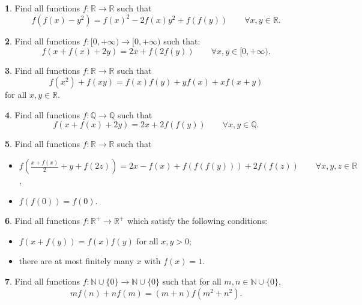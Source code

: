 \documentclass{article}
\theoremstyle{definition}
\newtheorem{p}{}
\begin{document}
\begin{p}
Find all functions $ f: \mathbb{R}\to\mathbb{R}$ such that 
\[f(f(x)-y^{2})=f(x)^{2}-2f(x)y^{2}+f(f(y)) \qquad \forall x,y \in \mathbb R.\]
\end{p}





\begin{p}
Find all functions $f: [0, +\infty) \to [0, +\infty)$ such that:
\[f(x+f(x)+2y)=2x+f(2f(y)) \qquad \forall x,y \in [0, +\infty).\]
\end{p}



\begin{p}
Find all functions $f:\mathbb{R}\to\mathbb{R}$ such that
\[f(x^2)+f(xy)=f(x)f(y)+yf(x)+xf(x+y)\]
for all $x,y\in\mathbb{R}$.
\end{p}


\begin{p}
Find all functions $ f: \mathbb{Q}\to\mathbb{Q}$ such that 
\[f(x+f(x)+2y)=2x+2f(f(y)) \qquad \forall x,y \in \mathbb Q.\]
\end{p}





\begin{p}
Find all functions $ f: \mathbb{R}\to\mathbb{R}$ such that 
\begin{itemize}
\item $f(\frac{x+f(x)}{2}+y+f(2z))=2x-f(x)+f(f(f(y)))+2f(f(z)) \qquad \forall x,y,z \in \mathbb R$,

\item $f(f(0))=f(0)$.

\end{itemize}
\end{p}



\begin{p}
Find all functions $f:\mathbb{R}^+ \to \mathbb{R}^+$ which satisfy the following conditions:
\begin{itemize}
\item $f(x+f(y))=f(x)f(y)$ for all $x,y>0;$
\item  there are at most finitely many $x$ with $f(x)=1$.
\end{itemize}
\end{p}



\begin{p}
Find all functions $f: \mathbb{N} \cup \{0 \} \to \mathbb{N} \cup \{0 \}$ such that for all $m,n\in \mathbb{N} \cup \{0 \}$, \[mf(n)+nf(m)=(m+n)f(m^{2}+n^{2}).\]
\end{p}
\end{document}
